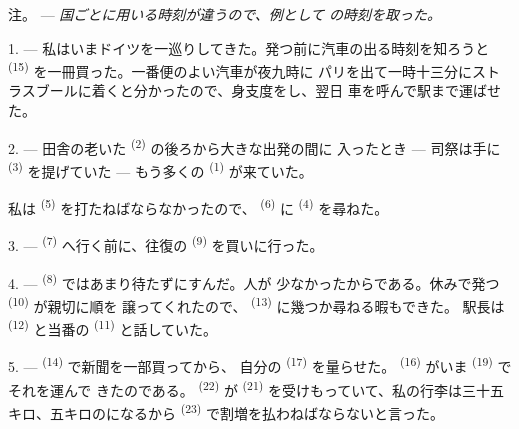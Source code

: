 %

\VUsaut{4.0mm}
\VUsaut{2.4mm}
\VUsaut{3.4mm}
\textsc{注。} --- \textit{国ごとに用いる時刻が違うので、例として}
\textit{の時刻を取った。}

1. --- 私はいまドイツを一巡りしてきた。発つ前に汽車の出る時刻を知ろうと
 \textsuperscript{(15)} を一冊買った。一番便のよい汽車が夜九時に
パリを出て一時十三分にストラスブールに着くと分かったので、身支度をし、翌日
車を呼んで駅まで運ばせた。

2. --- 田舎の老いた \textsuperscript{(2)} の後ろから大きな出発の間に
入ったとき --- 司祭は手に \textsuperscript{(3)} を提げていた ---
もう多くの \textsuperscript{(1)} が来ていた。

私は \textsuperscript{(5)} を打たねばならなかったので、
\textsuperscript{(6)} に \textsuperscript{(4)} を尋ねた。

3. ---  \textsuperscript{(7)} へ行く前に、往復の
\textsuperscript{(9)} を買いに行った。

4. ---  \textsuperscript{(8)} ではあまり待たずにすんだ。人が
少なかったからである。休みで発つ \textsuperscript{(10)} が親切に順を
譲ってくれたので、 \textsuperscript{(13)} に幾つか尋ねる暇もできた。
駅長は \textsuperscript{(12)} と当番の
\textsuperscript{(11)} と話していた。

\VUsaut{3.0mm}

5. ---  \textsuperscript{(14)} で新聞を一部買ってから、
自分の \textsuperscript{(17)} を量らせた。
\textsuperscript{(16)} がいま \textsuperscript{(19)} でそれを運んで
きたのである。 \textsuperscript{(22)} が \textsuperscript{(21)}
を受けもっていて、私の行李は三十五キロ、五キロのになるから
 \textsuperscript{(23)} で割増を払わねばならないと言った。


